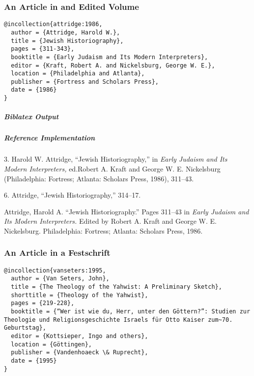 \documentclass[a4paper]{article}
\newenvironment{biboutput}{%
  \subparagraph{Biblatex Output}
}{\color{black}}
\newenvironment{refimp}{%
  \subparagraph{Reference Implementation}
  \color{reference-colour}
  \rm
}{\par\color{black}}
\begin{document}
\subsubsection{An Article in and Edited Volume}

\begin{lstlisting}
@incollection{attridge:1986,
  author = {Attridge, Harold W.},
  title = {Jewish Historiography},
  pages = {311-343},
  booktitle = {Early Judaism and Its Modern Interpreters},
  editor = {Kraft, Robert A. and Nickelsburg, George W. E.},
  location = {Philadelphia and Atlanta},
  publisher = {Fortress and Scholars Press},
  date = {1986}
}
\end{lstlisting}  

\begin{biboutput}
\end{biboutput}

\begin{refimp}
  \hspace*{\bibindent}3. Harold W. Attridge, “Jewish Historiography,” in
  \emph{Early Judaism and Its Modern Interpreters,} ed.\@ Robert A. Kraft and
  George W. E. Nickelsburg (Philadelphia: Fortress; Atlanta: Scholars Press,
  1986), 311–43.
  
  \hspace*{\bibindent}6. Attridge, “Jewish Historiography,” 314–17.

  Attridge, Harold A. “Jewish Historiography.” Pages 311–43 in \emph{Early
  Judaism and Its Modern Interpreters.} Edited by Robert A. Kraft and George
  W. E. Nickelsburg. Philadelphia: Fortress; Atlanta: Scholars Press, 1986.
\end{refimp}

\subsubsection{An Article in a Festschrift}

\begin{lstlisting}
@incollection{vanseters:1995,
  author = {Van Seters, John},
  title = {The Theology of the Yahwist: A Preliminary Sketch},
  shorttitle = {Theology of the Yahwist},
  pages = {219-228},
  booktitle = {“Wer ist wie du, Herr, unter den Göttern?”: Studien zur Theologie und Religionsgeschichte Israels für Otto Kaiser zum~70. Geburtstag},
  editor = {Kottsieper, Ingo and others},
  location = {Göttingen},
  publisher = {Vandenhoaeck \& Ruprecht},
  date = {1995}
}
\end{lstlisting}  
\end{document}
